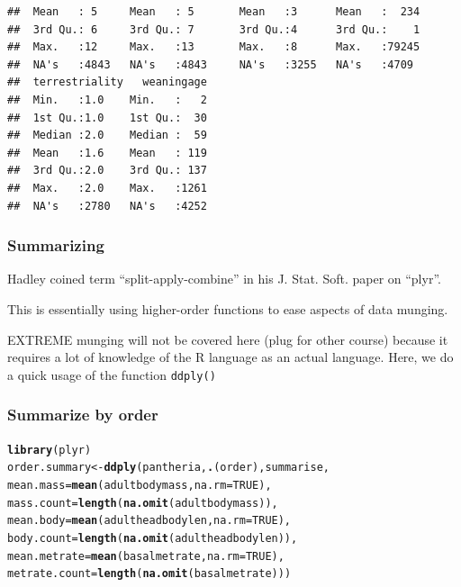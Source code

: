 \documentclass{beamer}\usepackage{graphicx, color}
\makeatletter
\newcommand{\hlfunctioncall}[1]{\textcolor[rgb]{0.501960784313725,0,0.329411764705882}{\textbf{#1}}}%
\newenvironment{kframe}{%
 \def\at@end@of@kframe{}%
 \ifinner\ifhmode%
  \def\at@end@of@kframe{\end{minipage}}%
  \begin{minipage}{\columnwidth}%
 \fi\fi%
 \def\FrameCommand##1{\hskip\@totalleftmargin \hskip-\fboxsep
 \colorbox{shadecolor}{##1}\hskip-\fboxsep
     \hskip-\linewidth \hskip-\@totalleftmargin \hskip\columnwidth}%
 \MakeFramed {\advance\hsize-\width
   \@totalleftmargin\z@ \linewidth\hsize
   \@setminipage}}%
 {\par\unskip\endMakeFramed%
 \at@end@of@kframe}
\newenvironment{knitrout}{}{} %
\makeatother
\begin{document}
\begin{frame}[fragile]
\begin{knitrout}
\begin{kframe}
\begin{verbatim}
##  Mean   : 5     Mean   : 5       Mean   :3      Mean   :  234  
##  3rd Qu.: 6     3rd Qu.: 7       3rd Qu.:4      3rd Qu.:    1  
##  Max.   :12     Max.   :13       Max.   :8      Max.   :79245  
##  NA's   :4843   NA's   :4843     NA's   :3255   NA's   :4709   
##  terrestriality   weaningage  
##  Min.   :1.0    Min.   :   2  
##  1st Qu.:1.0    1st Qu.:  30  
##  Median :2.0    Median :  59  
##  Mean   :1.6    Mean   : 119  
##  3rd Qu.:2.0    3rd Qu.: 137  
##  Max.   :2.0    Max.   :1261  
##  NA's   :2780   NA's   :4252
\end{verbatim}
\end{kframe}
\end{knitrout}

\end{frame}

\begin{frame}
  \frametitle{Summarizing}

  Hadley coined term ``split-apply-combine'' in his J. Stat. Soft. paper on ``plyr''.

  This is essentially using higher-order functions to ease aspects of data munging.

  EXTREME munging will not be covered here (plug for other course) because it requires a lot of knowledge of the R language as an actual language. Here, we do a quick usage of the function \tt{ddply()}

\end{frame}

\begin{frame}[fragile]
  \frametitle{Summarize by order}
\begin{knitrout}\scriptsize
{}\color{fgcolor}\begin{kframe}
\begin{alltt}
\hlfunctioncall{library}(plyr)
order.summary <- \hlfunctioncall{ddply}(pantheria, \hlfunctioncall{.}(order), summarise, 
                       mean.mass = \hlfunctioncall{mean}(adultbodymass, na.rm = TRUE),
                       mass.count = \hlfunctioncall{length}(\hlfunctioncall{na.omit}(adultbodymass)),
                       mean.body = \hlfunctioncall{mean}(adultheadbodylen, na.rm = TRUE),
                       body.count = \hlfunctioncall{length}(\hlfunctioncall{na.omit}(adultheadbodylen)),
                       mean.metrate = \hlfunctioncall{mean}(basalmetrate, na.rm = TRUE),
                       metrate.count = \hlfunctioncall{length}(\hlfunctioncall{na.omit}(basalmetrate)))
\end{alltt}
\end{kframe}
\end{knitrout}


\end{frame}
\end{document}
